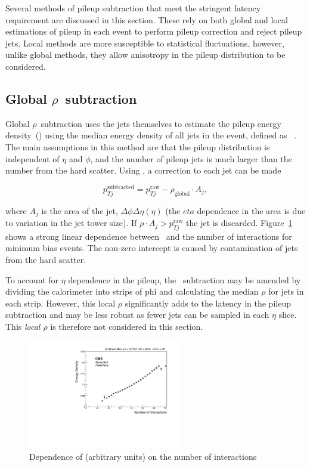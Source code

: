 Several methods of pileup subtraction that meet the stringent latency requirement
are discussed in this section. These rely on both global and local estimations of 
pileup in each event to perform pileup correction and reject pileup jets. 
Local methods are more susceptible to statistical fluctuations, however,
unlike global methods, they allow anisotropy in the 
pileup distribution to be considered.

\subsection{Global $\rho$~subtraction}

Global $\rho$~subtraction uses the jets themselves to estimate the pileup energy density~(\rhoP) using
the median energy density of all jets in the event, defined as \rhoG~\cite{jet_area}. 
The main assumptions in this method are that the pileup distribution is independent of $\eta$ and $\phi$,  
and the number of pileup jets is much larger than the number from the hard scatter. Using \rhoG, 
a correction to each jet can be made

\begin{equation}
\label{equ:global_rho}
p_{Tj}^{\text{subtracted}} = p_{Tj}^{\text{raw}} - \rho_{\text{global}} \cdot A_j,
\end{equation}


where $A_j$ is the area of the jet, $\Delta\phi\Delta\eta(\eta)$ (the $eta$ dependence in the area is due 
to variation in the jet tower size). If $\rho \cdot A_j > p_{Tj}^{\text{raw}}$ the jet is discarded. 
Figure~\ref{fig:medianNint} shows a strong linear dependence between \rhoG~and the number of interactions for
minimum bias events. The non-zero intercept is caused by contamination of jets from the hard scatter.

To account for $\eta$ dependence in the pileup, the \rhoG~subtraction may be amended by
dividing the calorimeter into strips of phi and calculating the median $\rho$ for jets in each 
strip. However, this local $\rho$ significantly adds to the latency in the pileup subtraction and may 
be less robust as fewer jets can be sampled in each $\eta$ slice. This \emph{local $\rho$} 
is therefore not considered in this section.

\begin{figure}
\centering
    \includegraphics[width=0.6\textwidth]{./Figures/triggerUpgrade/median}
  \caption{Dependence of \rhoG (arbitrary units) on the number of interactions}
  \label{fig:medianNint}
\end{figure}  

